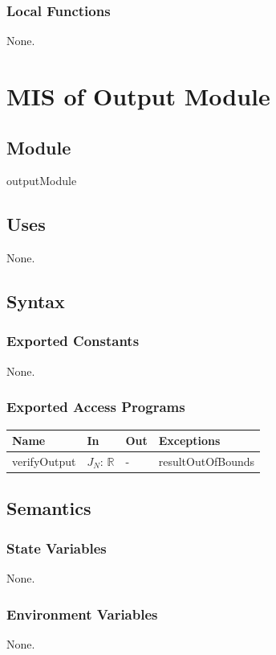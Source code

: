 \documentclass[12pt, titlepage]{article}
\begin{document}
\subsubsection{Local Functions}
None.

\newpage
  \section{MIS of Output Module} \label{M_O}

\subsection{Module}
outputModule

\subsection{Uses}
None.

\subsection{Syntax}
\subsubsection{Exported Constants}
None.

\subsubsection{Exported Access Programs}

\begin{center}
\begin{tabular}{p{3cm} p{3cm} p{2cm} p{4cm}}
\hline
\textbf{Name} & \textbf{In} & \textbf{Out} & \textbf{Exceptions} \\
\hline
verifyOutput & $J_N$: $\mathbb{R}$ & - & resultOutOfBounds \\
\hline
\end{tabular}
\end{center}

\subsection{Semantics}
\subsubsection{State Variables}
None.

\subsubsection{Environment Variables}
None.
\end{document}
